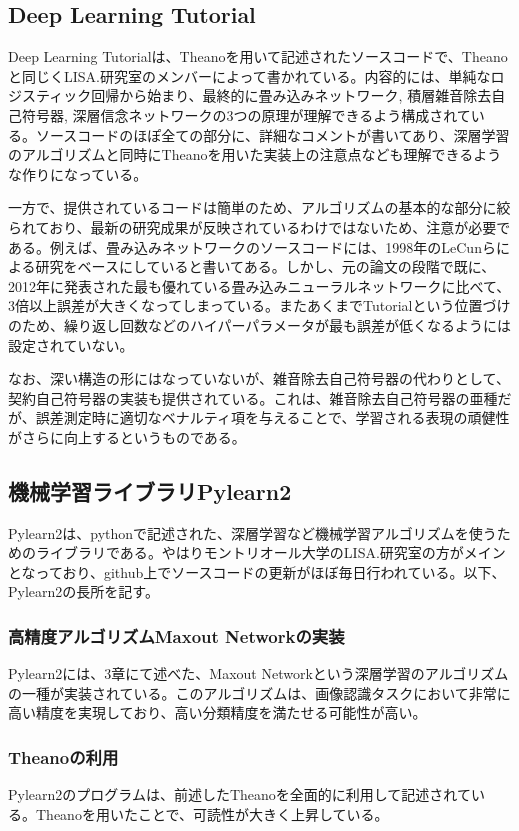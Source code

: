 \subsection{Deep Learning Tutorial}
Deep Learning Tutorialは、Theanoを用いて記述されたソースコードで、Theanoと同じくLISA.研究室のメンバーによって書かれている。内容的には、単純なロジスティック回帰から始まり、最終的に畳み込みネットワーク, 積層雑音除去自己符号器, 深層信念ネットワークの3つの原理が理解できるよう構成されている。ソースコードのほぽ全ての部分に、詳細なコメントが書いてあり、深層学習のアルゴリズムと同時にTheanoを用いた実装上の注意点なども理解できるような作りになっている。\par
一方で、提供されているコードは簡単のため、アルゴリズムの基本的な部分に絞られており、最新の研究成果が反映されているわけではないため、注意が必要である。例えば、畳み込みネットワークのソースコードには、1998年のLeCunらによる研究\cite{lecun1998gradient-based}をベースにしていると書いてある。しかし、元の論文の段階で既に、2012年に発表された最も優れている畳み込みニューラルネットワーク\cite{ciresan2012multi-column}に比べて、3倍以上誤差が大きくなってしまっている。またあくまでTutorialという位置づけのため、繰り返し回数などのハイパーパラメータが最も誤差が低くなるようには設定されていない。\par
なお、深い構造の形にはなっていないが、雑音除去自己符号器の代わりとして、契約自己符号器\cite{rifai2011contractive}\cite{rifai2011learning}の実装も提供されている。これは、雑音除去自己符号器の亜種だが、誤差測定時に適切なベナルティ項を与えることで、学習される表現の頑健性がさらに向上するというものである。

\subsection{機械学習ライブラリPylearn2}
Pylearn2は、pythonで記述された、深層学習など機械学習アルゴリズムを使うためのライブラリである\cite{goodfellow2013Pylearn2:}。やはりモントリオール大学のLISA.研究室の方がメインとなっており、github上でソースコードの更新がほぼ毎日行われている。以下、Pylearn2の長所を記す。
\subsubsection{高精度アルゴリズムMaxout Networkの実装}
Pylearn2には、3章にて述べた、Maxout Networkという深層学習のアルゴリズムの一種が実装されている。このアルゴリズムは、画像認識タスクにおいて非常に高い精度を実現しており、高い分類精度を満たせる可能性が高い。
\subsubsection{Theanoの利用}
Pylearn2のプログラムは、前述したTheanoを全面的に利用して記述されている。Theanoを用いたことで、可読性が大きく上昇している。
